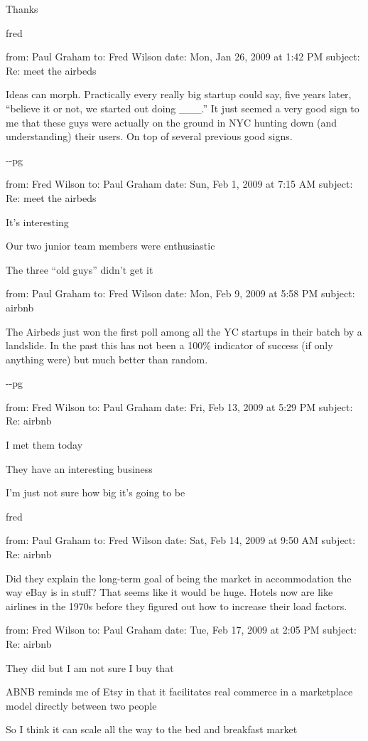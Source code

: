 Thanks

fred

from: Paul Graham to: Fred Wilson date: Mon, Jan 26, 2009 at 1:42 PM
subject: Re: meet the airbeds

Ideas can morph. Practically every really big startup could say, five
years later, ``believe it or not, we started out doing \_\_\_.'' It just
seemed a very good sign to me that these guys were actually on the
ground in NYC hunting down (and understanding) their users. On top of
several previous good signs.

-\/-pg

from: Fred Wilson to: Paul Graham date: Sun, Feb 1, 2009 at 7:15 AM
subject: Re: meet the airbeds

It's interesting

Our two junior team members were enthusiastic

The three ``old guys'' didn't get it

from: Paul Graham to: Fred Wilson date: Mon, Feb 9, 2009 at 5:58 PM
subject: airbnb

The Airbeds just won the first poll among all the YC startups in their
batch by a landslide. In the past this has not been a 100\% indicator of
success (if only anything were) but much better than random.

-\/-pg

from: Fred Wilson to: Paul Graham date: Fri, Feb 13, 2009 at 5:29 PM
subject: Re: airbnb

I met them today

They have an interesting business

I'm just not sure how big it's going to be

fred

from: Paul Graham to: Fred Wilson date: Sat, Feb 14, 2009 at 9:50 AM
subject: Re: airbnb

Did they explain the long-term goal of being the market in accommodation
the way eBay is in stuff? That seems like it would be huge. Hotels now
are like airlines in the 1970s before they figured out how to increase
their load factors.

from: Fred Wilson to: Paul Graham date: Tue, Feb 17, 2009 at 2:05 PM
subject: Re: airbnb

They did but I am not sure I buy that

ABNB reminds me of Etsy in that it facilitates real commerce in a
marketplace model directly between two people

So I think it can scale all the way to the bed and breakfast market

